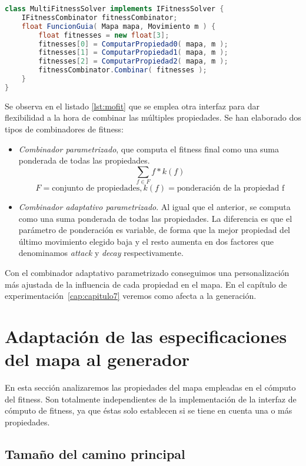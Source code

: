\begin{lstlisting}[caption={Interfaz de selección de movimiento basada en búsqueda},label={lst:mofit},language=Java,escapechar=|]
class MultiFitnessSolver implements IFitnessSolver {
	IFitnessCombinator fitnessCombinator;
	float FuncionGuia( Mapa mapa, Movimiento m ) {
		float fitnesses = new float[3];
		fitnesses[0] = ComputarPropiedad0( mapa, m );
		fitnesses[1] = ComputarPropiedad1( mapa, m );
		fitnesses[2] = ComputarPropiedad2( mapa, m );
		fitnessCombinator.Combinar( fitnesses );
	}
}
\end{lstlisting}

Se observa en el listado \ref{lst:mofit} que se emplea otra interfaz para dar flexibilidad a la hora de combinar las múltiples propiedades. Se han elaborado dos tipos de combinadores de fitness:

\begin{itemize}
	\item \emph{Combinador parametrizado}, que computa el fitness final como una suma ponderada de todas las propiedades.
		$$ \sum_{f \in F} f * k(f)$$
		$$F = \text{conjunto de propiedades}, k(f) = \text{ponderación de la propiedad f} $$
	\item \emph{Combinador adaptativo parametrizado}. Al igual que el anterior, se computa como una suma ponderada de todas las propiedades. La diferencia es que el parámetro de ponderación es variable, de forma que la mejor propiedad del último movimiento elegido baja y el resto aumenta en dos factores que denominamos \emph{attack} y \emph{decay} respectivamente.
\end{itemize}

Con el combinador adaptativo parametrizado conseguimos una personalización más ajustada de la influencia de cada propiedad en el mapa. En el capítulo de experimentación~\ref{cap:capitulo7} veremos como afecta a la generación.

\section{Adaptación de las especificaciones del mapa al generador}

En esta sección analizaremos las propiedades del mapa empleadas en el cómputo del fitness. Son totalmente independientes de la implementación de la interfaz de cómputo de fitness, ya que éstas solo establecen si se tiene en cuenta una o más propiedades.

\subsection{Tamaño del camino principal}


